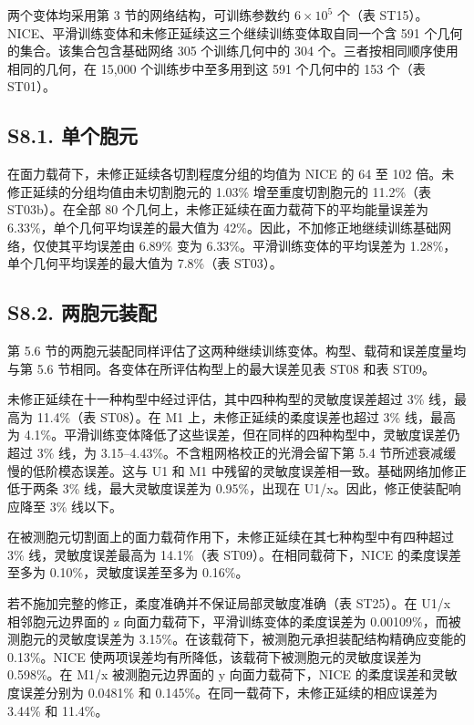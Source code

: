 \documentclass[preprint,12pt,authoryear]{elsarticle}
\begin{document}
两个变体均采用第 3 节的网络结构，可训练参数约 \(6\times10^5\) 个（表 ST15）。NICE、平滑训练变体和未修正延续这三个继续训练变体取自同一个含 591 个几何的集合。该集合包含基础网络 305 个训练几何中的 304 个。三者按相同顺序使用相同的几何，在 15,000 个训练步中至多用到这 591 个几何中的 153 个（表 ST01）。

\subsection{S8.1. 单个胞元}

在面力载荷下，未修正延续各切割程度分组的均值为 NICE 的 64 至 102 倍。未修正延续的分组均值由未切割胞元的 1.03\% 增至重度切割胞元的 11.2\%（表 ST03b）。在全部 80 个几何上，未修正延续在面力载荷下的平均能量误差为 6.33\%，单个几何平均误差的最大值为 42\%。因此，不加修正地继续训练基础网络，仅使其平均误差由 6.89\% 变为 6.33\%。平滑训练变体的平均误差为 1.28\%，单个几何平均误差的最大值为 7.8\%（表 ST03）。

\subsection{S8.2. 两胞元装配}

第 5.6 节的两胞元装配同样评估了这两种继续训练变体。构型、载荷和误差度量均与第 5.6 节相同。各变体在所评估构型上的最大误差见表 ST08 和表 ST09。

未修正延续在十一种构型中经过评估，其中四种构型的灵敏度误差超过 3\% 线，最高为 11.4\%（表 ST08）。在 M1 上，未修正延续的柔度误差也超过 3\% 线，最高为 4.1\%。平滑训练变体降低了这些误差，但在同样的四种构型中，灵敏度误差仍超过 3\% 线，为 3.15--4.43\%。不含粗网格校正的光滑会留下第 5.4 节所述衰减缓慢的低阶模态误差。这与 U1 和 M1 中残留的灵敏度误差相一致。基础网络加修正低于两条 3\% 线，最大灵敏度误差为 0.95\%，出现在 U1/x。因此，修正使装配响应降至 3\% 线以下。

在被测胞元切割面上的面力载荷作用下，未修正延续在其七种构型中有四种超过 3\% 线，灵敏度误差最高为 14.1\%（表 ST09）。在相同载荷下，NICE 的柔度误差至多为 0.10\%，灵敏度误差至多为 0.16\%。

若不施加完整的修正，柔度准确并不保证局部灵敏度准确（表 ST25）。在 U1/x 相邻胞元边界面的 z 向面力载荷下，平滑训练变体的柔度误差为 0.00109\%，而被测胞元的灵敏度误差为 3.15\%。在该载荷下，被测胞元承担装配结构精确应变能的 0.13\%。NICE 使两项误差均有所降低，该载荷下被测胞元的灵敏度误差为 0.598\%。在 M1/x 被测胞元边界面的 y 向面力载荷下，NICE 的柔度误差和灵敏度误差分别为 0.0481\% 和 0.145\%。在同一载荷下，未修正延续的相应误差为 3.44\% 和 11.4\%。
\end{document}
